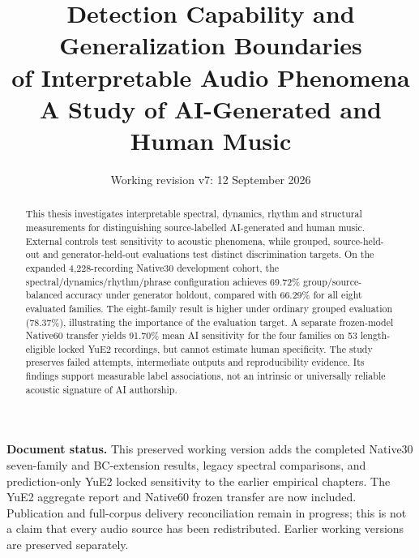 \documentclass[11pt,a4paper]{article}
\title{Detection Capability and Generalization Boundaries\\of Interpretable Audio Phenomena\\
\large A Study of AI-Generated and Human Music}
\author{}
\date{Working revision v7: 12 September 2026}
\begin{document}
\maketitle
\noindent\textbf{Document status.} This preserved working version adds the completed
Native30 seven-family and BC-extension results, legacy spectral comparisons,
and prediction-only YuE2 locked sensitivity to the earlier empirical chapters.
The YuE2 aggregate report and Native60 frozen transfer are now included.
Publication and full-corpus delivery reconciliation remain in progress; this is
not a claim that every audio source has been redistributed. Earlier working
versions are preserved separately.
\begin{abstract}
This thesis investigates interpretable spectral, dynamics, rhythm and structural
measurements for distinguishing source-labelled AI-generated and human music.
External controls test sensitivity to acoustic phenomena, while grouped,
source-held-out and generator-held-out evaluations test distinct discrimination
targets. On the expanded 4,228-recording Native30 development cohort, the
spectral/dynamics/rhythm/phrase configuration achieves 69.72\% group/source-balanced
accuracy under generator holdout, compared with 66.29\% for all eight evaluated
families. The eight-family result is higher under ordinary grouped evaluation
(78.37\%), illustrating the importance of the evaluation target. A separate
frozen-model Native60 transfer yields 91.70\% mean AI sensitivity for the four
families on 53 length-eligible locked YuE2 recordings, but cannot estimate human
specificity. The study preserves failed attempts, intermediate outputs and
reproducibility evidence. Its findings support measurable label associations,
not an intrinsic or universally reliable acoustic signature of AI authorship.
\end{abstract}
\tableofcontents
\clearpage















\end{document}
